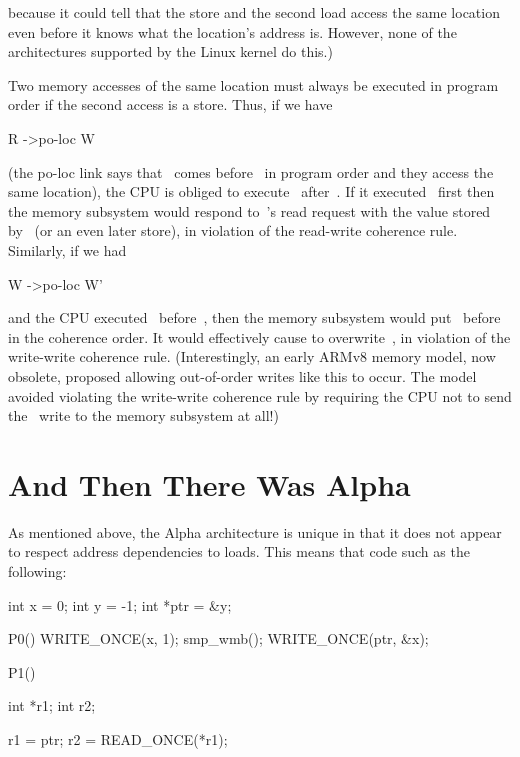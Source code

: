 \noindent%
because it could tell that the store and the second load access the
same location even before it knows what the location's address is.
However, none of the architectures supported by the Linux kernel do
this.)

Two memory accesses of the same location must always be executed in
program order if the second access is a store.
Thus, if we have

\begin{VerbatimU}
	R ->po-loc W
\end{VerbatimU}

\noindent%
(the po-loc link says that ~comes before~ in program order and they
access the same location), the CPU is obliged to execute~ after~.
If it executed~ first then the memory subsystem would respond to~'s
read request with the value stored by~ (or an even later store), in
violation of the read-write coherence rule.
Similarly, if we had

\begin{VerbatimU}
	W ->po-loc W'
\end{VerbatimU}

\noindent%
and the CPU executed~ before~, then the memory subsystem would
put~ before~ in the coherence order.
It would effectively cause  to overwrite~, in violation of
the write-write coherence rule.
(Interestingly, an early ARMv8 memory model, now obsolete, proposed
allowing out-of-order writes like this to occur.
The model avoided violating the write-write coherence rule by
requiring the CPU not to send the ~write to the memory subsystem at all!)


\section{And Then There Was Alpha}
\label{sec:docs:explanation:And Then There Was Alpha}

As mentioned above, the Alpha architecture is unique in that it does
not appear to respect address dependencies to loads.
This means that code such as the following:

\begin{VerbatimU}
	int x = 0;
	int y = -1;
	int *ptr = &y;

	P0()
	{
		WRITE_ONCE(x, 1);
		smp_wmb();
		WRITE_ONCE(ptr, &x);
	}

	P1()
	{
		int *r1;
		int r2;

		r1 = ptr;
		r2 = READ_ONCE(*r1);
	}
\end{VerbatimU}

